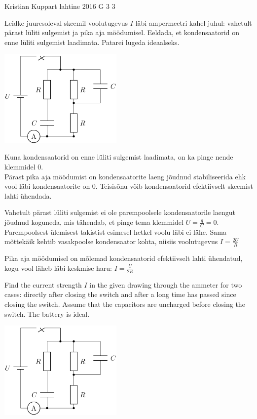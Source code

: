 {Kristian Kuppart} %
{lahtine} %
{2016} %
{G 3} %
{3} %
{
\ifStatement

Leidke juuresoleval skeemil voolutugevus $I$ läbi ampermeetri kahel juhul: vahetult pärast lüliti sulgemist ja pika aja möödumisel. Eeldada, et kondensaatorid on enne lüliti sulgemist laadimata. Patarei lugeda ideaalseks.
\begin{center}
\includegraphics[width=0.45\textwidth]{2016-lahg-03-skeemjoonis.png}
\end{center}
\fi


\ifHint
Kuna kondensaatorid on enne lüliti sulgemist laadimata, on ka pinge nende klemmidel $0$.\\
Pärast pika aja möödumist on kondensaatorite laeng jõudnud stabiliseerida ehk vool läbi kondensaatorite on $0$. Teisisõnu võib kondensaatorid efektiivselt skeemist lahti ühendada.
\fi


\ifSolution
Vahetult pärast lüliti sulgemist ei ole parempoolsele kondensaatorile laengut jõudnud koguneda, mis tähendab, et pinge tema klemmidel $U=\frac{q}{C}=0$. Parempoolsest ülemisest takistist esimesel hetkel voolu läbi ei lähe. Sama mõttekäik kehtib vasakpoolse kondensaator kohta, niisiis voolutugevus $I=\frac{2U}{R}$ 

Pika aja möödumisel on mõlemad kondensaatorid efektiivselt lahti ühendatud, kogu vool läheb läbi keskmise haru: $I=\frac{U}{2R}$
\fi


\ifEngStatement
Find the current strength $I$ in the given drawing through the ammeter for two cases: directly after closing the switch and after a long time has passed since closing the switch. Assume that the capacitors are uncharged before closing the switch. The battery is ideal. 
\begin{center}
\includegraphics[width=0.45\textwidth]{2016-lahg-03-skeemjoonis}
\end{center}
\fi


}
